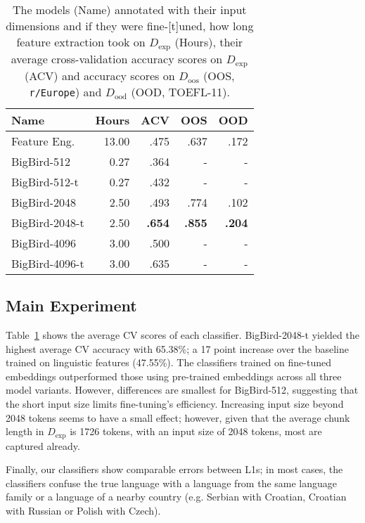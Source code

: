 \documentclass[10pt, a4paper]{article}
\begin{document}
\begin{table}[t]
    \centering
    \footnotesize
    \begin{tabular}{lrrrr}
        \toprule
        Name & Hours & ACV & OOS & OOD \\
        \midrule
        Feature Eng.   & 13.00 & .475      & .637      & .172 \\
        BigBird-512           &  0.27 & .364      &    -      & - \\
        BigBird-512-t    &  0.27 & .432      &    -      & - \\
        BigBird-2048          &  2.50 & .493      & .774      & .102 \\
        BigBird-2048-t    &  2.50 & \bf{.654} & \bf{.855} & \bf{.204} \\      
        BigBird-4096          &  3.00 & .500      &    -      & - \\
        BigBird-4096-t   &  3.00 & .635      &    -      & - \\
        \bottomrule
    \end{tabular}
    \caption{The models (Name) annotated with their input dimensions and if they were fine-[t]uned, how long feature extraction took on $D_\text{exp}$ (Hours), their average cross-validation accuracy scores on $D_\text{exp}$ (ACV) and accuracy scores on $D_\text{oos}$ (OOS, \texttt{r/Europe}) and $D_\text{ood}$ (OOD, TOEFL-11).}
    \label{tab:results}
\end{table}


\subsection{Main Experiment}

Table~\ref{tab:results} shows the average CV scores of each classifier. BigBird-2048-t yielded the highest average CV accuracy with 65.38\%; a 17 point increase over the baseline trained on linguistic features (47.55\%). The classifiers trained on fine-tuned embeddings outperformed those using pre-trained embeddings across all three model variants. However, differences are smallest for BigBird-512, suggesting that the short input size limits fine-tuning's efficiency. Increasing input size beyond 2048 tokens seems to have a small effect; however, given that the average chunk length in $D_\text{exp}$ is 1726 tokens, with an input size of 2048 tokens, most are captured already.

Finally, our classifiers show comparable errors between L1s;  in most cases, the classifiers confuse the true language with a language from the same language family or a language of a nearby country (e.g. Serbian with Croatian, Croatian with Russian or Polish with Czech).
\end{document}

